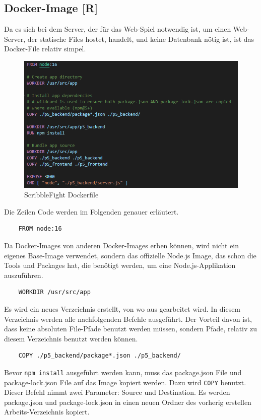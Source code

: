 \subsection{Docker-Image [R]}
Da es sich bei dem Server, der für das Web-Spiel notwendig ist, um einen Web-Server, der statische Files hostet, handelt, und keine Datenbank nötig ist, ist das Docker-File relativ simpel.
\begin{figure}[H]
    \centering
    \includegraphics[scale=0.85]{pics/dockerfile_scribble.PNG}
    \caption{ScribbleFight Dockerfile}
\end{figure}
Die Zeilen Code werden im Folgenden genauer erläutert. \\
\begin{lstlisting}
    FROM node:16
\end{lstlisting}
Da Docker-Images von anderen Docker-Images erben können, wird nicht ein eigenes Base-Image verwendet, sondern das offizielle Node.js Image, das schon die Tools und Packages hat, die benötigt werden, um eine Node.js-Applikation auszuführen.
\\
\begin{lstlisting}
    WORKDIR /usr/src/app
\end{lstlisting}
Es wird ein neues Verzeichnis erstellt, von wo aus gearbeitet wird.
In diesem Verzeichnis werden alle nachfolgenden Befehle ausgeführt. Der Vorteil davon ist, dass keine absoluten File-Pfade benutzt werden müssen, sondern Pfade, relativ zu diesem Verzeichnis benutzt werden können. \\


\begin{lstlisting}
    COPY ./p5_backend/package*.json ./p5_backend/
\end{lstlisting}
Bevor \texttt{npm install} ausgeführt werden kann, muss das package.json File und package-lock.json File auf das Image kopiert werden.
Dazu wird \texttt{COPY} benutzt. Dieser Befehl nimmt zwei Parameter: Source und Destination. Es werden package.json und package-lock.json in einen neuen Ordner des vorherig erstellen Arbeits-Verzeichnis kopiert. \\

